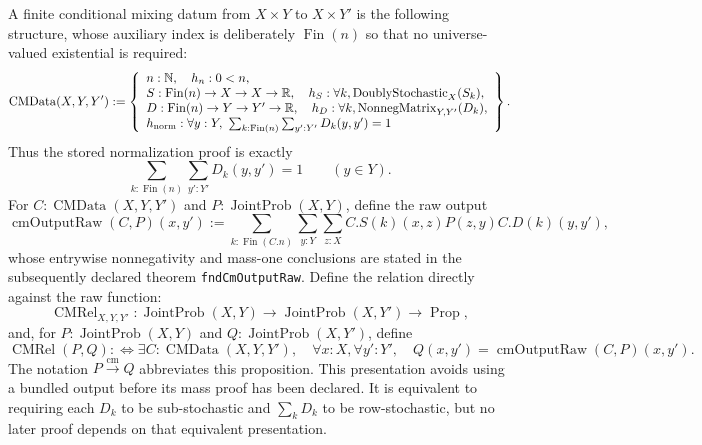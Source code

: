 \documentclass[9pt]{extarticle}
\theoremstyle{definition}
\theoremstyle{remark}
\newcommand{\R}{\mathbb R}
\newcommand{\N}{\mathbb N}
\begin{document}
A finite conditional mixing datum from $X\times Y$ to $X\times Y'$ is the
following structure, whose auxiliary index is deliberately
$\operatorname{Fin}(n)$ so that no universe-valued existential is required:
\[
 \operatorname{CMData}(X,Y,Y'):=
 \left\{
 \begin{array}{l}
 n:\N,\quad h_n:0<n,\\
 S:\operatorname{Fin}(n)\to X\to X\to\R,\quad
 h_S:\forall k,\operatorname{DoublyStochastic}_X(S_k),\\
 D:\operatorname{Fin}(n)\to Y\to Y'\to\R,\quad
 h_D:\forall k,\operatorname{NonnegMatrix}_{Y,Y'}(D_k),\\
 h_{\rm norm}:\forall y:Y,\
  \sum_{k:\operatorname{Fin}(n)}\sum_{y':Y'}D_k(y,y')=1
 \end{array}\right\}.
\]
Thus the stored normalization proof is exactly
\begin{equation}
 \sum_{k:\operatorname{Fin}(n)}\sum_{y':Y'}D_k(y,y')=1
 \qquad(y\in Y).
 \label{eq:foundation-conditional-normalization}
\end{equation}
For $C:\operatorname{CMData}(X,Y,Y')$ and
$P:\operatorname{JointProb}(X,Y)$, define the raw output
\begin{equation}
 \operatorname{cmOutputRaw}(C,P)(x,y')
 :=\sum_{k:\operatorname{Fin}(C.n)}\sum_{y:Y}\sum_{z:X}
 C.S(k)(x,z)P(z,y)C.D(k)(y,y'),
 \label{eq:foundation-channel-output}
\end{equation}
whose entrywise nonnegativity and mass-one conclusions are stated in the
subsequently declared theorem \texttt{fndCmOutputRaw}.  Define the relation directly
against the raw function:
\[
 \operatorname{CMRel}_{X,Y,Y'}:
 \operatorname{JointProb}(X,Y)\to\operatorname{JointProb}(X,Y')
 \to\operatorname{Prop},
\]
and, for $P:\operatorname{JointProb}(X,Y)$ and
$Q:\operatorname{JointProb}(X,Y')$, define
\[
 \operatorname{CMRel}(P,Q):\Longleftrightarrow
 \exists C:\operatorname{CMData}(X,Y,Y'),\quad
 \forall x:X,\forall y':Y',\quad
 Q(x,y')=\operatorname{cmOutputRaw}(C,P)(x,y').
\]
The notation $P\xrightarrow{\mathrm{cm}}Q$ abbreviates this proposition.
This presentation avoids using a bundled output before its mass proof has
been declared.  It is equivalent to requiring each $D_k$ to be
sub-stochastic and $\sum_kD_k$ to be row-stochastic, but no later proof
depends on that equivalent presentation.
\end{document}

